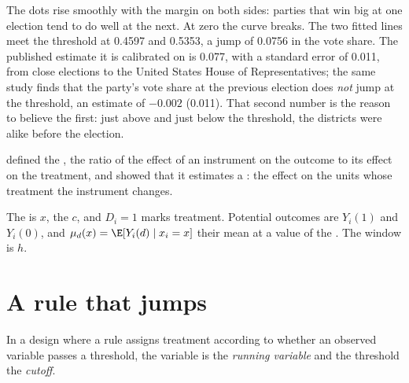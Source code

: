 The dots rise smoothly with the margin on both sides: parties that win big at
one election tend to do well at the next. At zero the curve breaks. The two
fitted lines meet the threshold at 0.4597 and 0.5353, a jump of 0.0756 in the
vote share. %
The published estimate it is calibrated on is 0.077, with a standard error of
0.011, from close elections to the United States House of Representatives; the
same study finds that the party's vote share at the previous election does
\emph{not} jump at the threshold, an estimate of $-0.002$ (0.011). %
That second number is the reason to believe the first: just above and just
below the threshold, the districts were alike before the election.

\begin{recall}
 defined the , the ratio of
the effect of an instrument on the outcome to its effect on the treatment, and
showed that it estimates a : the effect on the
units whose treatment the instrument changes.
\end{recall}

\begin{notation}\label{not:b3:regression-discontinuity:symbols}
The  is $x$, the  $c$, and $D_i = 1$ marks treatment.
Potential outcomes are $Y_i(1)$ and $Y_i(0)$, and $\mu_d(x) = \E[Y_i(d) \mid
x_i = x]$ their mean at a value of the . The window is $h$.
\end{notation}

\section{A rule that jumps}\label{sec:b3:regression-discontinuity:rule}

\begin{definition}\label{def:b3:regression-discontinuity:running-variable}
In a design where a rule assigns treatment according to whether an observed
variable passes a threshold, the variable is the \emph{running variable} and the
threshold the \emph{cutoff}.
\end{definition}

